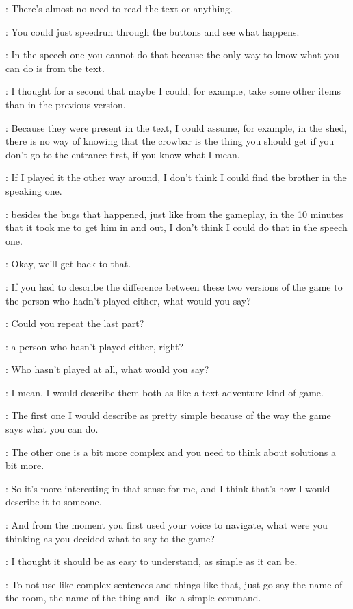\Kacper: There's almost no need to read the text or anything.

\Kacper: You could just speedrun through the buttons and see what happens.

\Kacper: In the speech one you cannot do that because the only way to know what you can do is from the text.

\Kacper: I thought for a second that maybe I could, for example, take some other items than in the previous version.

\Kacper: Because they were present in the text, I could assume, for example, in the shed, there is no way of knowing that the crowbar is the thing you should get if you don't go to the entrance first, if you know what I mean.

\Kacper: If I played it the other way around, I don't think I could find the brother in the speaking one.

\Kacper: besides the bugs that happened, just like from the gameplay, in the 10 minutes that it took me to get him in and out, I don't think I could do that in the speech one.

\Gabriel: Okay, we'll get back to that.

\Gabriel: If you had to describe the difference between these two versions of the game to the person who hadn't played either, what would you say?

\Gabriel: Could you repeat the last part?

\Gabriel: a person who hasn't played either, right?

\Gabriel: Who hasn't played at all, what would you say?

\Kacper: I mean, I would describe them both as like a text adventure kind of game.

\Kacper: The first one I would describe as pretty simple because of the way the game says what you can do.

\Kacper: The other one is a bit more complex and you need to think about solutions a bit more.

\Kacper: So it's more interesting in that sense for me, and I think that's how I would describe it to someone.

\Gabriel: And from the moment you first used your voice to navigate, what were you thinking as you decided what to say to the game?

\Kacper: I thought it should be as easy to understand, as simple as it can be.

\Kacper: To not use like complex sentences and things like that, just go say the name of the room, the name of the thing and like a simple command.

